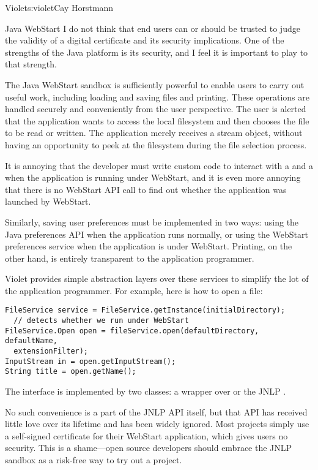 \begin{aosachapter}{Violet}{s:violet}{Cay Horstmann}
\begin{aosasect1}{Java WebStart}
I do not think that end users can or should be trusted to judge the
validity of a digital certificate and its security implications. One
of the strengths of the Java platform is its security, and I feel it
is important to play to that strength.

The Java WebStart sandbox is sufficiently powerful to enable users to
carry out useful work, including loading and saving files and
printing.  These operations are handled securely and conveniently from
the user perspective. The user is alerted that the application wants
to access the local filesystem and then chooses the file to be read
or written. The application merely receives a stream object, without
having an opportunity to peek at the filesystem during the file
selection process.

It is annoying that the developer must write
custom code to interact with a  and a
 when the application is running under WebStart,
and it is even more annoying that there is no WebStart API call to
find out whether the application was launched by WebStart.

Similarly, saving user preferences must be implemented in two ways:
using the Java preferences API when the application runs normally, or
using the WebStart preferences service when the application is under
WebStart. Printing, on the other hand, is entirely transparent to the
application programmer.

Violet provides simple abstraction layers over these services to
simplify the lot of the application programmer. For example, here is
how to open a file:

\begin{verbatim}
FileService service = FileService.getInstance(initialDirectory);
  // detects whether we run under WebStart
FileService.Open open = fileService.open(defaultDirectory, defaultName, 
  extensionFilter);
InputStream in = open.getInputStream();
String title = open.getName();
\end{verbatim}

\noindent The  interface is implemented by two classes: a
wrapper over  or the JNLP .

No such convenience is a part of the JNLP API itself, but that API has
received little love over its lifetime and has been widely
ignored. Most projects simply use a self-signed certificate for their
WebStart application, which gives users no security. This is a
shame---open source developers should embrace the JNLP sandbox as a
risk-free way to try out a project.


\end{aosasect1}
\end{aosachapter}
